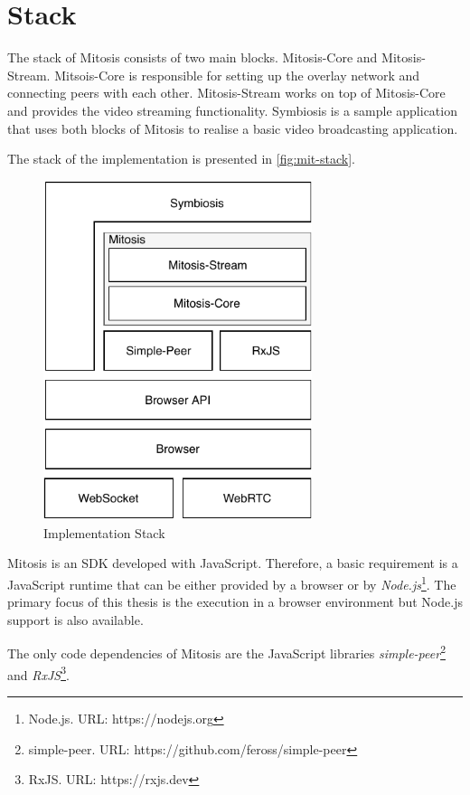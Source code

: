 \section{Stack}
The stack of Mitosis consists of two main blocks. Mitosis-Core and Mitosis-Stream. Mitsois-Core is responsible for setting up the overlay network and connecting peers with each other. Mitosis-Stream works on top of Mitosis-Core and provides the video streaming functionality.
Symbiosis is a sample application that uses both blocks of Mitosis to realise a basic video broadcasting application.

The stack of the implementation is presented in \vref{fig:mit-stack}.

\begin{figure}
\centering
\includegraphics[width=0.7\textwidth]{graphics/implementation/mitosis-overall.pdf}
\caption{Implementation Stack}
\label{fig:mit-stack}
\end{figure}

Mitosis is an SDK developed with JavaScript. Therefore, a basic requirement is a JavaScript runtime that can be either provided by a browser or by \textit{Node.js}\footnote{Node.js. URL: {https://nodejs.org}}. The primary focus of this thesis is the execution in a browser environment but Node.js support is also available.

The only code dependencies of Mitosis are the JavaScript libraries \textit{simple-peer}\footnote{simple-peer. URL: {https://github.com/feross/simple-peer}} and \textit{RxJS}\footnote{RxJS. URL: {https://rxjs.dev}}. 

